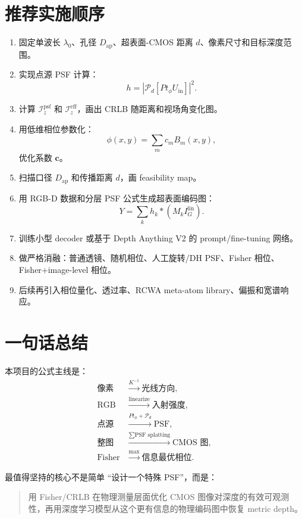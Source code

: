 \documentclass[11pt,a4paper,fontset=none]{ctexart}
\begin{document}
\section{推荐实施顺序}

\begin{enumerate}
  \item 固定单波长 $\lambda_0$、孔径 $D_{\mathrm{ap}}$、超表面-CMOS 距离 $d$、像素尺寸和目标深度范围。
  \item 实现点源 PSF 计算：
  \begin{equation}
    h=
    \left|
    \mathcal P_d
    \left[
    P t_\phi U_{\mathrm{in}}
    \right]
    \right|^2.
  \end{equation}
  \item 计算 $\mathcal I_z^{\mathrm{psf}}$ 和 $\mathcal I_z^{\mathrm{eff}}$，画出 CRLB 随距离和视场角变化图。
  \item 用低维相位参数化：
  \begin{equation}
    \phi(x,y)=\sum_m c_m B_m(x,y),
  \end{equation}
  优化系数 $\bm c$。
  \item 扫描口径 $D_{\mathrm{ap}}$ 和传播距离 $d$，画 feasibility map。
  \item 用 RGB-D 数据和分层 PSF 公式生成超表面编码图：
  \begin{equation}
    Y=
    \sum_k
    h_k*(M_kI_G^{\mathrm{lin}}).
  \end{equation}
  \item 训练小型 decoder 或基于 Depth Anything V2 的 prompt/fine-tuning 网络。
  \item 做严格消融：普通透镜、随机相位、人工旋转/DH PSF、Fisher 相位、Fisher+image-level 相位。
  \item 后续再引入相位量化、透过率、RCWA meta-atom library、偏振和宽谱响应。
\end{enumerate}

\section{一句话总结}

本项目的公式主线是：
\begin{equation}
\begin{aligned}
  \text{像素}&\xrightarrow{K^{-1}}\text{光线方向},\\
  \text{RGB}&\xrightarrow{\mathrm{linearize}}\text{入射强度},\\
  \text{点源}&\xrightarrow{P t_\phi+\mathcal P_d}\text{PSF},\\
  \text{整图}&\xrightarrow{\sum \text{PSF splatting}}\text{CMOS 图},\\
  \text{Fisher}&\xrightarrow{\max}\text{信息最优相位}.
\end{aligned}
\end{equation}

最值得坚持的核心不是简单 ``设计一个特殊 PSF''，而是：
\begin{quote}
用 Fisher/CRLB 在物理测量层面优化 CMOS 图像对深度的有效可观测性，再用深度学习模型从这个更有信息的物理编码图中恢复 metric depth。
\end{quote}
\end{document}
